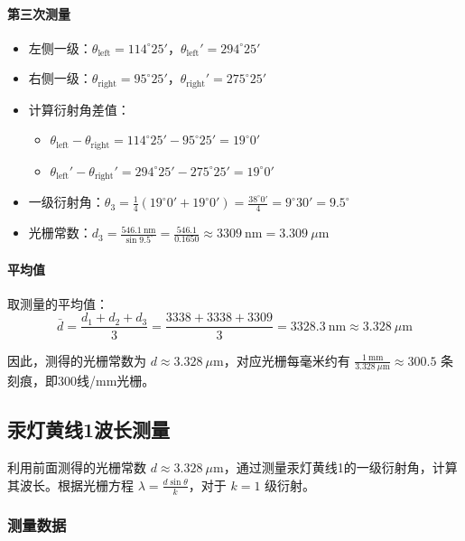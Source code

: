 \documentclass[11pt]{article}
\begin{document}
\paragraph{第三次测量}

\begin{itemize}[itemsep=0.3ex]
\item 左侧一级：\(\theta_{\text{left}} = 114^\circ25'\)，\(\theta_{\text{left}}' = 294^\circ25'\)
\item 右侧一级：\(\theta_{\text{right}} = 95^\circ25'\)，\(\theta_{\text{right}}' = 275^\circ25'\)
\item 计算衍射角差值：
  \begin{itemize}
  \item \(\theta_{\text{left}} - \theta_{\text{right}} = 114^\circ25' - 95^\circ25' = 19^\circ0'\)
  \item \(\theta_{\text{left}}' - \theta_{\text{right}}' = 294^\circ25' - 275^\circ25' = 19^\circ0'\)
  \end{itemize}
\item 一级衍射角：\(\theta_3 = \frac{1}{4}(19^\circ0' + 19^\circ0') = \frac{38^\circ0'}{4} = 9^\circ30' = 9.5^\circ\)
\item 光栅常数：\(d_3 = \frac{546.1\ \text{nm}}{\sin 9.5^\circ} = \frac{546.1}{0.1650} \approx 3309\ \text{nm} = 3.309\ \mu\text{m}\)
\end{itemize}

\paragraph{平均值}

取测量的平均值：
\[
\bar{d} = \frac{d_1 + d_2 + d_3}{3} = \frac{3338 + 3338 + 3309}{3} = 3328.3\ \text{nm} \approx 3.328\ \mu\text{m}
\]

因此，测得的光栅常数为 \(d \approx 3.328\ \mu\text{m}\)，对应光栅每毫米约有 \(\frac{1\ \text{mm}}{3.328\ \mu\text{m}} \approx 300.5\) 条刻痕，即300线/mm光栅。

\subsection{汞灯黄线1波长测量}

利用前面测得的光栅常数 \(d \approx 3.328\ \mu\text{m}\)，通过测量汞灯黄线1的一级衍射角，计算其波长。根据光栅方程 \(\lambda = \frac{d\sin\theta}{k}\)，对于 \(k=1\) 级衍射。

\subsubsection{测量数据}
\end{document}
